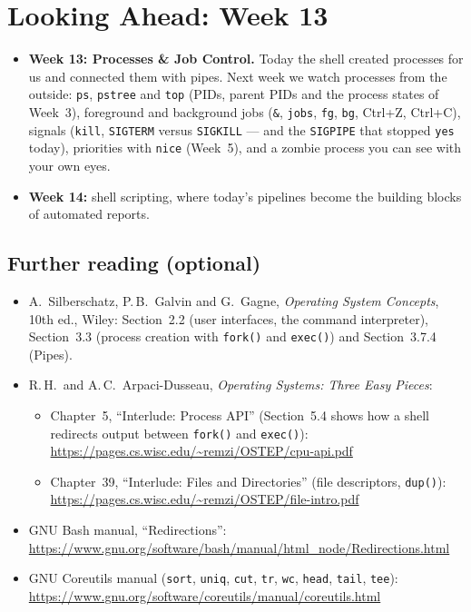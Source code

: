 \documentclass[11pt,a4paper]{article}
\newcommand{\cmd}[1]{\texttt{#1}}
\begin{document}
\section{Looking Ahead: Week 13}

\begin{itemize}
  \item \textbf{Week 13: Processes \& Job Control.} Today the shell created processes for us and connected them with pipes. Next week we watch processes from the outside: \cmd{ps}, \cmd{pstree} and \cmd{top} (PIDs, parent PIDs and the process states of Week~3), foreground and background jobs (\cmd{\&}, \cmd{jobs}, \cmd{fg}, \cmd{bg}, Ctrl+Z, Ctrl+C), signals (\cmd{kill}, \texttt{SIGTERM} versus \texttt{SIGKILL} --- and the \texttt{SIGPIPE} that stopped \cmd{yes} today), priorities with \cmd{nice} (Week~5), and a zombie process you can see with your own eyes.
  \item \textbf{Week 14:} shell scripting, where today's pipelines become the building blocks of automated reports.
\end{itemize}

\subsection*{Further reading (optional)}
\begin{itemize}
  \item A.\ Silberschatz, P.\,B.\ Galvin and G.\ Gagne, \emph{Operating System Concepts}, 10th ed., Wiley: Section~2.2 (user interfaces, the command interpreter), Section~3.3 (process creation with \cmd{fork()} and \cmd{exec()}) and Section~3.7.4 (Pipes).
  \item R.\,H.\ and A.\,C.\ Arpaci-Dusseau, \emph{Operating Systems: Three Easy Pieces}:
  \begin{itemize}
    \item Chapter~5, ``Interlude: Process API'' (Section~5.4 shows how a shell redirects output between \cmd{fork()} and \cmd{exec()}): \url{https://pages.cs.wisc.edu/~remzi/OSTEP/cpu-api.pdf}
    \item Chapter~39, ``Interlude: Files and Directories'' (file descriptors, \cmd{dup()}): \url{https://pages.cs.wisc.edu/~remzi/OSTEP/file-intro.pdf}
  \end{itemize}
  \item GNU Bash manual, ``Redirections'': \url{https://www.gnu.org/software/bash/manual/html_node/Redirections.html}
  \item GNU Coreutils manual (\cmd{sort}, \cmd{uniq}, \cmd{cut}, \cmd{tr}, \cmd{wc}, \cmd{head}, \cmd{tail}, \cmd{tee}): \url{https://www.gnu.org/software/coreutils/manual/coreutils.html}
\end{itemize}
\end{document}
